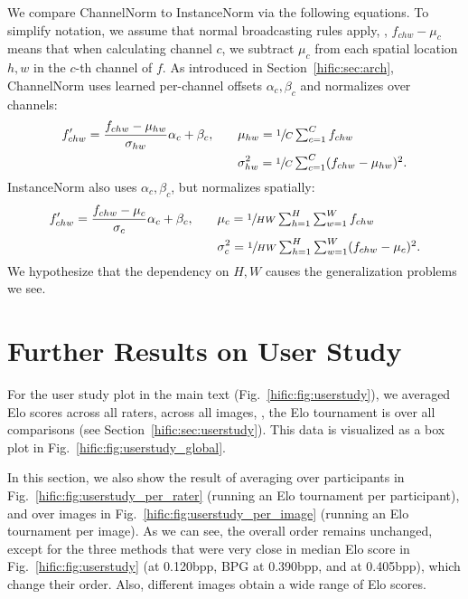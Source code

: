 \begin{subappendices}
We compare ChannelNorm to InstanceNorm via the following equations. To simplify notation, we assume that normal broadcasting rules apply, \eg, $f_{chw}-\mu_c$ means that when calculating channel $c$, we subtract $\mu_c$ from each spatial location $h, w$ in the $c$-th channel of $f$. As introduced in Section~\ref{hific:sec:arch}, ChannelNorm uses learned per-channel offsets $\alpha_c, \beta_c$ and normalizes over channels:
\begin{align*}
    f'_{chw} = \frac{f_{chw}-\mu_{hw}}{\sigma_{hw}}
                \alpha_c + \beta_c, 
        &\qquad \mu_{hw} = \sfrac{1}{C} \textstyle \sum_{c=1}^C f_{chw} \\
        &\qquad \sigma_{hw}^2 = \sfrac{1}{C} \textstyle \sum_{c=1}^C (f_{chw} - \mu_{hw})^2.
\end{align*}
InstanceNorm also uses $\alpha_c, \beta_c$, but normalizes spatially:
\begin{align*}
    f'_{chw} = \frac{f_{chw}-\mu_{c}}{\sigma_{c}}
                \alpha_c + \beta_c, 
        &\qquad \mu_{c} = \sfrac{1}{HW} 
          \textstyle \sum_{h=1}^H \textstyle \sum_{w=1}^W 
          f_{chw} \\
        &\qquad \sigma_{c}^2 = \sfrac{1}{HW} 
          \textstyle \sum_{h=1}^H \textstyle \sum_{w=1}^W 
          (f_{chw} - \mu_{c})^2.
\end{align*}
We hypothesize that the dependency on $H, W$ causes the generalization problems we see.


\newpage

\section{Further Results on User Study} \label{hific:sec:supp:userstudy}

For the user study plot in the main text (Fig.~\ref{hific:fig:userstudy}), we averaged Elo scores across all raters, across all images, \ie, the Elo tournament is over all comparisons (see Section~\ref{hific:sec:userstudy}). This data is visualized as a box plot in Fig.~\ref{hific:fig:userstudy_global}.

In this section, we also show the result of averaging over participants in Fig.~\ref{hific:fig:userstudy_per_rater} (running an Elo tournament per participant), and over images in Fig.~\ref{hific:fig:userstudy_per_image} (running an Elo tournament per image).
As we can see, the overall order remains unchanged, except for the three methods that were very close in median Elo score in Fig.~\ref{hific:fig:userstudy} (\name at 0.120bpp, BPG at 0.390bpp, and \blminnen at 0.405bpp), which change their order. Also, different images obtain a wide range of Elo scores. 


\end{subappendices}
